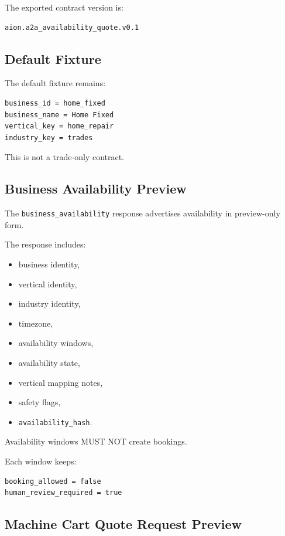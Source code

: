 The exported contract version is:

\begin{verbatim}
aion.a2a_availability_quote.v0.1
\end{verbatim}

\subsection{Default Fixture}

The default fixture remains:

\begin{verbatim}
business_id = home_fixed
business_name = Home Fixed
vertical_key = home_repair
industry_key = trades
\end{verbatim}

This is not a trade-only contract.

\subsection{Business Availability Preview}

The \texttt{business\_availability} response advertises availability in preview-only form.

The response includes:

\begin{itemize}
  \item business identity,
  \item vertical identity,
  \item industry identity,
  \item timezone,
  \item availability windows,
  \item availability state,
  \item vertical mapping notes,
  \item safety flags,
  \item \texttt{availability\_hash}.
\end{itemize}

Availability windows MUST NOT create bookings.

Each window keeps:

\begin{verbatim}
booking_allowed = false
human_review_required = true
\end{verbatim}

\subsection{Machine Cart Quote Request Preview}

